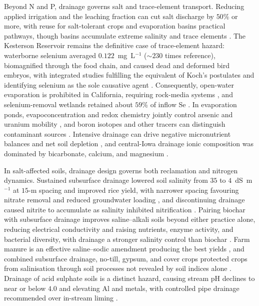 \documentclass[11pt]{article}
\begin{document}
Beyond N and P, drainage governs salt and trace-element transport. Reducing
applied irrigation and the leaching fraction can cut salt discharge by $50\%$
or more, with reuse for salt-tolerant crops and evaporation basins practical
pathways, though basins accumulate extreme salinity and trace elements
\parencite{WESTCOT1988}. The Kesterson Reservoir remains the definitive case
of trace-element hazard: waterborne selenium averaged $0.122$~mg~L$^{-1}$
($\sim230$ times reference), biomagnified through the food chain, and caused
dead and deformed bird embryos, with integrated studies fulfilling the
equivalent of Koch's postulates and identifying selenium as the sole causative
agent \parencite{SAIKI1987,Ohlendorf2002,BENSON1993}. Consequently, open-water
evaporation is prohibited in California, requiring rock-media systems
\parencite{Ayars2014,BRADFORD1991}, and selenium-removal wetlands retained
about $59\%$ of inflow Se \parencite{Gao2003}. In evaporation ponds,
evapoconcentration and redox chemistry jointly control arsenic and uranium
mobility \parencite{Ryu2010,Gao2007,Duff1997}, and boron isotopes and other
tracers can distinguish contaminant sources \parencite{Tayfur2010,Komor1997,Zhou2023}.
Intensive drainage can drive negative micronutrient balances and net soil
depletion \parencite{Gul2013}, and central-Iowa drainage ionic composition was
dominated by bicarbonate, calcium, and magnesium \parencite{Zimmerman2017b}.

In salt-affected soils, drainage design governs both reclamation and nitrogen
dynamics. Sustained subsurface drainage lowered soil salinity from $35$ to
$4$~dS~m$^{-1}$ at $15$-m spacing and improved rice yield, with narrower
spacing favouring nitrate removal and reduced groundwater loading
\parencite{Singh2002,Singh2001c,Gafni2001}, and discontinuing drainage caused
nitrite to accumulate as salinity inhibited nitrification \parencite{Singh2007}.
Pairing biochar with subsurface drainage improves saline--alkali soils beyond
either practice alone, reducing electrical conductivity and raising nutrients,
enzyme activity, and bacterial diversity, with drainage a stronger salinity
control than biochar \parencite{Tian2023b,Liu2025f,Xiong2025}. Farm manure is
an effective saline--sodic amendment producing the best yields
\parencite{Qadir2001}, and combined subsurface drainage, no-till, gypsum, and
cover crops protected crops from salinisation through soil processes not
revealed by soil indices alone \parencite{Daigh2025,Zhang2024d,Zhu2025}.
Drainage of acid sulphate soils is a distinct hazard, causing stream pH
declines to near or below $4.0$ and elevating Al and metals, with controlled
pipe drainage recommended over in-stream liming
\parencite{Osterholm2005,Åström2005,Virtanen2017,Salo2023}.
\end{document}
